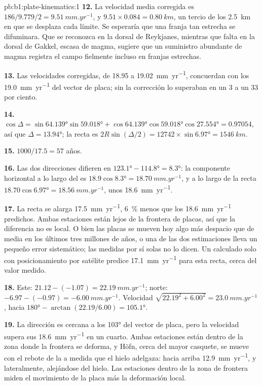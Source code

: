 \begin{solution}{pb:b1:plate-kinematics:1}
\textbf{12.} La velocidad media corregida es $186/9.779/2 = \qty{9.51}{mm.yr^{-1}}$,
y $9.51\times0.084 = \qty{0.80}{km}$, un tercio de los \qty{2.5}{km} en que
se desplaza cada límite. Se esperaría que una franja tan estrecha se difuminara.
Que se reconozca en la dorsal de Reykjanes, mientras que falta en la dorsal de
Gakkel, escasa de magma, sugiere que un suministro abundante de magma registra el campo
fielmente incluso en franjas estrechas.

\textbf{13.} Las velocidades corregidas, de 18.95 a \qty{19.02}{mm.yr^{-1}}, concuerdan con
los \qty{19.0}{mm.yr^{-1}} del vector de placa; sin la corrección lo superaban en
un 3 a un 33 por ciento.

\textbf{14.} $\cos\Delta = \sin\ang{64.139}\sin\ang{59.018} +
\cos\ang{64.139}\cos\ang{59.018}\cos\ang{27.554} = 0.97054$, así que $\Delta =
\ang{13.94}$; la recta es $2R\sin(\Delta/2) = 12742\times\sin\ang{6.97} =
\qty{1546}{km}$.

\textbf{15.} $1000/17.5 = 57$ años.

\textbf{16.} Las dos direcciones difieren en $\ang{123.1} - \ang{114.8} =
\ang{8.3}$: la componente horizontal a lo largo del  es
$18.9\cos\ang{8.3} = \qty{18.70}{mm.yr^{-1}}$, y a lo largo de la recta
$18.70\cos\ang{6.97} = \qty{18.56}{mm.yr^{-1}}$, unos \qty{18.6}{mm.yr^{-1}}.

\textbf{17.} La recta se alarga \qty{17.5}{mm.yr^{-1}}, \qty{6}{\percent} menos que los \qty{18.6}{mm.yr^{-1}} predichos. Ambas
estaciones están lejos de la frontera de placas, así que la diferencia no es local. O bien las placas se mueven hoy algo más despacio
que de media en los últimos tres millones de años, o una de las dos estimaciones lleva un pequeño error sistemático; las medidas por
sí solas no lo dicen. Un  calculado solo con posicionamiento por satélite predice \qty{17.1}{mm.yr^{-1}} para esta
recta, cerca del valor medido.

\textbf{18.} Este: $21.12 - (-1.07) = \qty{22.19}{mm.yr^{-1}}$; norte:
$-6.97 - (-0.97) = \qty{-6.00}{mm.yr^{-1}}$. Velocidad $\sqrt{22.19^2 + 6.00^2} =
\qty{23.0}{mm.yr^{-1}}$, hacia $\ang{180} - \arctan(22.19/6.00) =
\ang{105.1}$.

\textbf{19.} La dirección es cercana a los \ang{103} del vector de placa, pero la velocidad supera sus \qty{18.6}{mm.yr^{-1}} en un
cuarto. Ambas estaciones están dentro de la zona donde la frontera se deforma, y Höfn, cerca del mayor casquete, se mueve con el
rebote de la  a medida que el hielo adelgaza: hacia arriba \qty{12.9}{mm.yr^{-1}}, y lateralmente, alejándose del hielo. Las
estaciones dentro de la zona de frontera miden el movimiento de la placa más la deformación local.


\end{solution}
